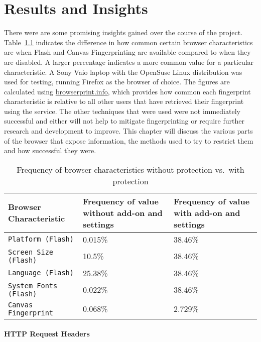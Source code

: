\chapter{Results and Insights}

There were are some promising insights gained over the course of the project.
Table~\ref{tab:results} indicates the difference in how common certain browser characteristics are when Flash and Canvas Fingerprinting are available compared to when they are disabled.
A larger percentage indicates a more common value for a particular characteristic.
A Sony Vaio laptop with the OpenSuse Linux distribution was used for testing, running Firefox as the browser of choice.
The figures are calculated using \url{browserprint.info}, which provides how common each fingerprint characteristic is relative to all other users that have retrieved their fingerprint using the service.
The other techniques that were used were not immediately successful and either will not help to mitigate fingerprinting or require further research and development to improve.
This chapter will discuss the various parts of the browser that expose information, the methods used to try to restrict them and how successful they were.

\begin{table}[h!]
\centering
\begin{tabular}{| p{6cm} | p{4cm} | p{4cm} |}
    \hline
    \textbf{Browser Characteristic} & \textbf{Frequency of value without add-on and settings} & \textbf{Frequency of value with add-on and settings} \\ \hline
    \texttt{Platform (Flash)} & {0.015\%} & {38.46\%} \\ \hline
    \texttt{Screen Size (Flash)} & {10.5\%} & {38.46\%} \\ \hline
    \texttt{Language (Flash)} & {25.38\%} & {38.46\%} \\ \hline
    \texttt{System Fonts (Flash)} & {0.022\%} & {38.46\%} \\ \hline
    \texttt{Canvas Fingerprint} & {0.068\%} & {2.729\%} \\
    \hline
\end{tabular}
\caption{Frequency of browser characteristics without protection vs.\ with protection}
\label{tab:results}
\end{table}

\subsubsection{HTTP Request Headers}


